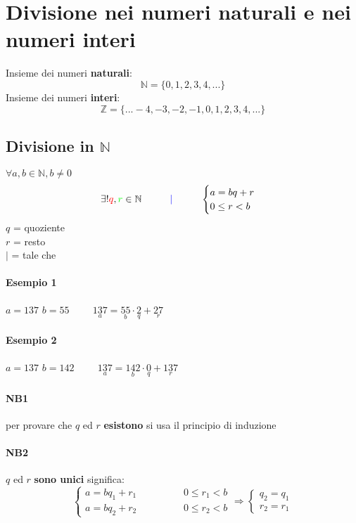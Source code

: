 \section{Divisione nei numeri naturali e nei numeri interi}
Insieme dei numeri \textbf{naturali}:
$$ \mathbb{N} = \{0, 1, 2, 3, 4, ...\}$$
Insieme dei numeri \textbf{interi}:
$$ \mathbb{Z} = \{... -4,-3,-2,-1,0, 1, 2, 3, 4, ...\}$$
    \subsection{Divisione in $\mathbb{N}$}
    $\forall a, b \in \mathbb{N}, b\neq 0 $\\
    $$  
    \exists! {\color{red} q}, {\color{green} r}\in \mathbb{N} 
        \hspace{1cm} {\color{blue} | \hspace{1cm}} 
        \begin{cases}
            a=bq+r\\
            0\leq r < b
        \end{cases}
    $$
    {\color{red} $q$ = quoziente}\\
    {\color{green} $r$ = resto}\\
    {\color{blue} $|$ = tale che}\\
    \paragraph{Esempio 1} $a=137$ $b=55 \hspace{1cm} \underset{a}{137}=\underset{b}{55}
    \cdot\underset
    {q}{2}+\underset{r}{27}$
    \paragraph{Esempio 2} $a=137$ $b=142 \hspace{1cm}\underset{a}{137}=\underset{b}{142}
    \cdot\underset{q}{0}+\underset{r}{137}$
    \paragraph{NB1} per provare che $q$ ed $r$ \textbf{esistono} 
    si usa il principio di induzione
    \paragraph{NB2} $q$ ed $r$ \textbf{sono unici} significa:
    $$
    \begin{cases}
        a=bq_1+r_1 \hspace{2cm} 0\leq r_1 < b\\
        a=bq_2+r_2 \hspace{2cm} 0\leq r_2 < b
    \end{cases}
    \Longrightarrow
    \begin{cases}
        q_2=q_1\\
        r_2=r_1
    \end{cases}
    $$\\

